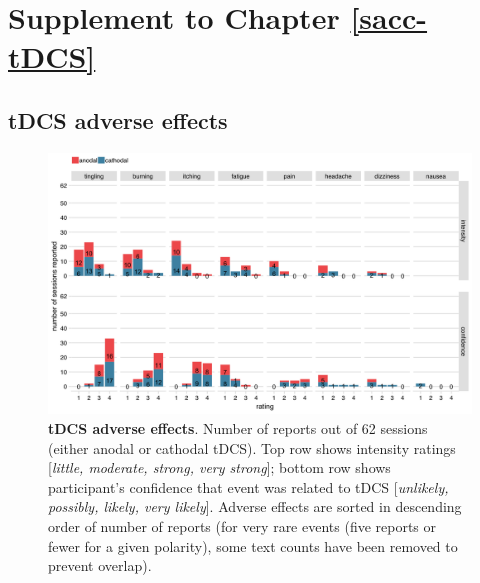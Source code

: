 \documentclass[11pt,]{memoir}
\begin{document}
\hypertarget{appendix-appendix}{%
\appendix}


\cleardoublepage
{}
{}
\appendixpage*

\hypertarget{sacc-tDCS-supplement}{%
\chapter{Supplement to Chapter \ref{sacc-tDCS}}\label{sacc-tDCS-supplement}}

\hypertarget{tdcs-adverse-effects}{%
\section{tDCS adverse effects}\label{tdcs-adverse-effects}}

\begin{figure}[H]
\includegraphics{sacc_tDCS_files/figures/figure_S1_AE} \caption{\textbf{tDCS adverse effects}. Number of reports out of 62 sessions (either anodal or cathodal tDCS). Top row shows intensity ratings {[}\emph{little, moderate, strong, very strong}{]}; bottom row shows participant's confidence that event was related to tDCS {[}\emph{unlikely, possibly, likely, very likely}{]}. Adverse effects are sorted in descending order of number of reports (for very rare events (five reports or fewer for a given polarity), some text counts have been removed to prevent overlap).}\label{fig:fig-sacc-tDCS-AE}
\end{figure}
\end{document}
